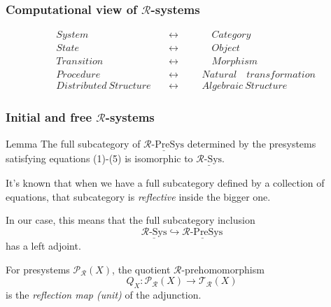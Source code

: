 \documentclass{beamer}
\begin{document}
\begin{frame}
    \frametitle{Computational view of $\mathcal{R}$-systems}
    \large
    \begin{align*}
        &System \quad &&\leftrightarrow  &&&\quad Category \\
        &State \quad &&\leftrightarrow &&&\quad  Object \\
        &Transition \quad &&\leftrightarrow &&&\quad Morphism \\ 
        &Procedure \quad &&\leftrightarrow &&&Natural \quad transformation \\ 
        &Distributed\ Structure\ &&\leftrightarrow &&& Algebraic\ Structure 
    \end{align*}
\end{frame}
\begin{frame}
    \small 
    \frametitle{Initial and free $\mathcal{R}$-systems}
    \begin{block}{Lemma}
        The full subcategory of $\underline{\mathcal{R}\text{-PreSys}}$ determined  
        by the presystems satisfying equations (1)-(5) is isomorphic to $\underline{\mathcal{R}\text{-Sys}}$.
    \end{block}

    \bigskip
    It's known that when we have a full subcategory defined by a collection of equations, that subcategory  is 
    \emph{reflective} inside the bigger one. 
    
    In our case, this means that the full subcategory inclusion 
    $$ \underline{\mathcal{R}\text{-Sys}} \hookrightarrow \underline{\mathcal{R}\text{-PreSys}}$$
    has a left adjoint.

    \bigskip
    \pause
    For presystems $\mathcal{P_R}(X)$, the quotient $\mathcal{R}$-prehomomorphism 
    $$Q_X:\mathcal{P_R}(X) \rightarrow \mathcal{T_R}(X)$$
    is the \emph{reflection map (unit)} of the adjunction.

\end{frame}
\end{document}
